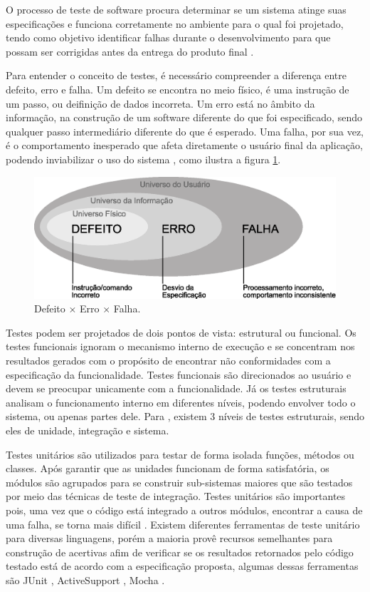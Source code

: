 O processo de teste de software procura determinar se um sistema atinge suas especificações e funciona corretamente no ambiente para o qual foi projetado, tendo como objetivo identificar falhas durante o desenvolvimento para que possam ser corrigidas antes da entrega do produto final  \cite{neto2005}. 

Para entender o conceito de testes, é necessário compreender a diferença entre defeito, erro e falha. Um defeito se encontra no meio físico, é uma instrução de um passo, ou deifinição de dados incorreta. Um erro está no âmbito da informação, na construção de um software diferente do que foi especificado, sendo qualquer passo intermediário diferente do que é esperado. Uma falha, por sua vez, é o comportamento inesperado que afeta diretamente o usuário final da aplicação, podendo inviabilizar o uso do sistema \cite{ieee1990}, como ilustra a figura \ref{fig:erro}. 

\begin{figure}[h!]
	\centering
  	\includegraphics[width=.9\linewidth]{figuras/erro.eps}
  	\caption{Defeito \(\times\) Erro \(\times\) Falha.}
  	\label{fig:erro}
\end{figure}

Testes podem ser projetados de dois pontos de vista: estrutural ou funcional. Os testes funcionais ignoram o mecanismo interno de execução e se concentram nos resultados gerados com o propósito de encontrar não conformidades com a especificação da funcionalidade. Testes funcionais são direcionados ao usuário e devem se preocupar unicamente com a funcionalidade. Já os testes estruturais analisam o funcionamento interno em diferentes níveis, podendo envolver todo o sistema, ou apenas partes dele. Para , existem 3 níveis de testes estruturais, sendo eles de unidade, integração e sistema.

Testes unitários são utilizados para testar de forma isolada funções, métodos ou classes. Após garantir que as unidades funcionam de forma satisfatória, os módulos são agrupados para se construir sub-sistemas maiores que são testados por meio das técnicas de teste de integração. Testes unitários são importantes pois, uma vez que o código está integrado a outros módulos, encontrar a causa de uma falha, se torna mais difícil \cite{naik2008}. Existem diferentes ferramentas de teste unitário para diversas linguagens, porém a maioria provê recursos semelhantes para construção de acertivas afim de verificar se os resultados retornados pelo código testado está de acordo com a especificação proposta, algumas dessas ferramentas são JUnit \cite{junit2015}, ActiveSupport \cite{activetest2015}, Mocha \cite{mocha2015}.

